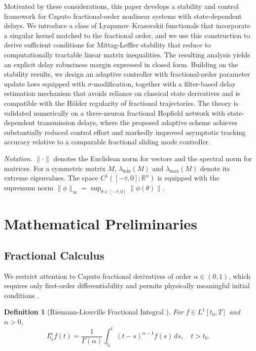 \documentclass[12pt,a4paper]{article}
\newtheorem{definition}{Definition}
\begin{document}
Motivated by these considerations, this paper develops a stability and control framework for Caputo fractional-order nonlinear systems with state-dependent delays. We introduce a class of Lyapunov--Krasovskii functionals that incorporate a singular kernel matched to the fractional order, and we use this construction to derive sufficient conditions for Mittag-Leffler stability that reduce to computationally tractable linear matrix inequalities. The resulting analysis yields an explicit delay robustness margin expressed in closed form. Building on the stability results, we design an adaptive controller with fractional-order parameter update laws equipped with $\sigma$-modification, together with a filter-based delay estimation mechanism that avoids reliance on classical state derivatives and is compatible with the H\"older regularity of fractional trajectories. The theory is validated numerically on a three-neuron fractional Hopfield network with state-dependent transmission delays, where the proposed adaptive scheme achieves substantially reduced control effort and markedly improved asymptotic tracking accuracy relative to a comparable fractional sliding mode controller.

\textit{Notation.} $\|\cdot\|$ denotes the Euclidean norm for vectors and the spectral norm for matrices. For a symmetric matrix $M$, $\lambda_{\min}(M)$ and $\lambda_{\max}(M)$ denote its extreme eigenvalues. The space $C^1([-\bar{\tau},0];\mathbb{R}^n)$ is equipped with the supremum norm $\|\phi\|_{\infty}=\sup_{\theta\in[-\bar{\tau},0]}\|\phi(\theta)\|$.


\section{Mathematical Preliminaries}
\label{sec:prelim}

\subsection{Fractional Calculus}

We restrict attention to Caputo fractional derivatives of order $\alpha \in (0,1)$, which requires only first-order differentiability and permits physically meaningful initial conditions \cite{podlubny1999}.

\begin{definition}[Riemann-Liouville Fractional Integral \cite{kilbas2006}]
For $f \in L^1[t_0, T]$ and $\alpha > 0$,
\begin{equation}
    I^{\alpha}_{t_0} f(t) = \frac{1}{\Gamma(\alpha)} \int_{t_0}^{t} (t-s)^{\alpha-1} f(s) \, ds, \quad t > t_0.
\end{equation}
\end{definition}
\end{document}
